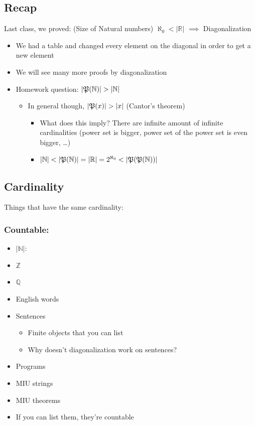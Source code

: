 \documentclass[11pt]{article}
\begin{document}
\subsection{Recap}
\label{sec:orgf3aba2a}
Last class, we proved:
(Size of Natural numbers) \(\aleph_0 < |\mathbb{R}|\)
\(\implies\) Diagonalization
\begin{itemize}
\item We had a table and changed every element on the diagonal in order to get a new element
\item We will see many more proofs by diagonalization
\item Homework question: \(|\frak{P}(\mathbb{N})|>|\mathbb{N}|\)
\begin{itemize}
\item In general though, \(|\frak{P}(x)|>|x|\) (Cantor's theorem)
\begin{itemize}
\item What does this imply? There are infinite amount of infinite cardinalities (power set is bigger, power set of the power set is even bigger, \ldots{})
\item \(|\mathbb{N}|<|\frak{P}(\mathbb{N})|=|\mathbb{R}|=2^{\aleph_0}<|\frak{P}(\frak{P}(\mathbb{N}))|\)
\end{itemize}
\end{itemize}
\end{itemize}

\subsection{Cardinality}
\label{sec:org85ceb99}
Things that have the same cardinality:
\subsubsection{Countable:}
\label{sec:org12172ad}
\begin{itemize}
\item \(|\mathbb{N}|\):
\item \(\mathbb{Z}\)
\item \(\mathbb{Q}\)
\item English words
\item Sentences
\begin{itemize}
\item Finite objects that you can list
\item Why doesn't diagonalization work on sentences?
\end{itemize}
\item Programs
\item MIU strings
\item MIU theorems
\item If you can list them, they're countable
\end{itemize}
\end{document}
